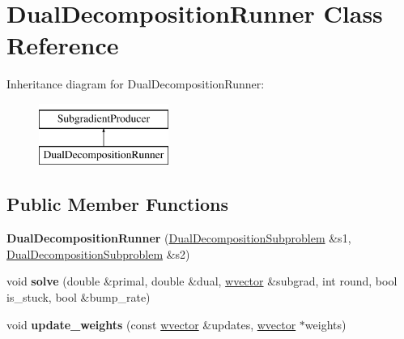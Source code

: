 \hypertarget{classDualDecompositionRunner}{
\section{DualDecompositionRunner Class Reference}
\label{classDualDecompositionRunner}
}
Inheritance diagram for DualDecompositionRunner:\begin{figure}[H]
\begin{center}
\leavevmode
\includegraphics[height=2cm]{classDualDecompositionRunner}
\end{center}
\end{figure}
\subsection*{Public Member Functions}
\begin{DoxyCompactItemize}
\item 
\hypertarget{classDualDecompositionRunner_ad0af4c8b1a73612770d329cf560af9d1}{
{\bfseries DualDecompositionRunner} (\hyperlink{classDualDecompositionSubproblem}{DualDecompositionSubproblem} \&s1, \hyperlink{classDualDecompositionSubproblem}{DualDecompositionSubproblem} \&s2)}
\label{classDualDecompositionRunner_ad0af4c8b1a73612770d329cf560af9d1}

\item 
\hypertarget{classDualDecompositionRunner_a4bcec895359acf32000d42155c4593ef}{
void {\bfseries solve} (double \&primal, double \&dual, \hyperlink{classsvector}{wvector} \&subgrad, int round, bool is\_\-stuck, bool \&bump\_\-rate)}
\label{classDualDecompositionRunner_a4bcec895359acf32000d42155c4593ef}

\item 
\hypertarget{classDualDecompositionRunner_a3cdf7ce33f6454f9fee9fb9c3287c5ac}{
void {\bfseries update\_\-weights} (const \hyperlink{classsvector}{wvector} \&updates, \hyperlink{classsvector}{wvector} $\ast$weights)}
\label{classDualDecompositionRunner_a3cdf7ce33f6454f9fee9fb9c3287c5ac}

\end{DoxyCompactItemize}
